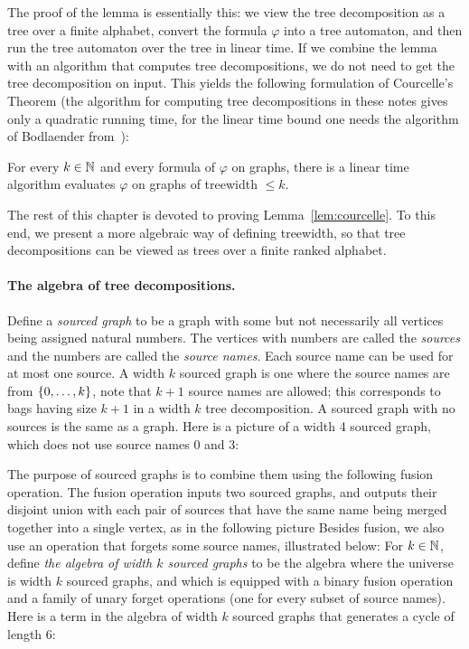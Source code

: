 The proof of the lemma is essentially this: we view the tree decomposition as a tree over a finite alphabet, convert the formula $\varphi$ into a tree automaton, and then run the tree automaton over the tree in linear time. 
If we combine the lemma with an algorithm that computes tree decompositions, we do not need to get the tree decomposition on input.  This yields the following formulation of   Courcelle's Theorem (the algorithm for computing tree decompositions in these notes gives only a quadratic running time, for the linear time bound one needs the algorithm of Bodlaender from~\cite{Bodlaender:1993da}):
\begin{theorem}
	For every $k \in \mathbb{N}$ and every formula of \mso $\varphi$ on graphs, there is a linear time algorithm evaluates $\varphi$ on graphs of treewidth $\le k$.
\end{theorem}

The rest of this chapter is devoted to proving Lemma~\ref{lem:courcelle}. To this end,  we present a more algebraic way of defining treewidth, so that tree decompositions can be viewed as trees over a finite ranked alphabet.

\paragraph*{The algebra of tree decompositions.} Define a \emph{sourced graph} to be a graph with some but not necessarily all vertices being assigned natural numbers. The vertices with numbers are called the \emph{sources} and the numbers are called the \emph{source names}. Each source name can be used for at most one source.  A width $k$ sourced graph is one where the source names are from $\{0,\ldots,k\}$, note that $k+1$ source names are allowed; this corresponds to bags having size $k+1$ in a width $k$ tree decomposition. A sourced graph with no sources is the same as a graph.  Here is a picture of a width 4 sourced graph, which does not use source names 0 and 3: 



The  purpose of sourced graphs is to combine them using the following  fusion operation. The fusion operation inputs two sourced graphs, and  outputs their disjoint union  with each pair of sources that have the same name being merged together into a single vertex, as in the following picture
Besides fusion, we also use an operation that  forgets some source names, illustrated below:
For $k \in \mathbb{N}$, define \emph{the algebra of width $k$ sourced graphs} to be the algebra where the universe is width $k$ sourced graphs, and which is equipped with  a binary fusion operation and a family of unary forget operations (one for every subset of source names).  Here is  a term in the algebra of width $k$  sourced graphs that generates a cycle of length 6:


